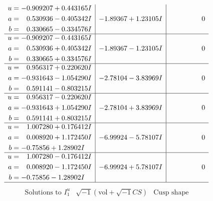 \documentclass[1p]{elsarticle_modified}
\theoremstyle{definition}
\newcommand{\I}{\sqrt{-1}}
\begin{document}
$$\begin{array}{c|c|c}
\begin{aligned}
u &= -0.909207 + 0.443165 I \\
a &= \phantom{-}0.530936 - 0.405342 I \\
b &= \phantom{-}0.330665 - 0.334576 I\end{aligned}
 & -1.89367 + 1.23105 I & \phantom{-0.000000 } 0 \\ \hline\begin{aligned}
u &= -0.909207 - 0.443165 I \\
a &= \phantom{-}0.530936 + 0.405342 I \\
b &= \phantom{-}0.330665 + 0.334576 I\end{aligned}
 & -1.89367 - 1.23105 I & \phantom{-0.000000 } 0 \\ \hline\begin{aligned}
u &= \phantom{-}0.956317 + 0.220620 I \\
a &= -0.931643 - 1.054290 I \\
b &= \phantom{-}0.591141 - 0.803215 I\end{aligned}
 & -2.78104 - 3.83969 I & \phantom{-0.000000 } 0 \\ \hline\begin{aligned}
u &= \phantom{-}0.956317 - 0.220620 I \\
a &= -0.931643 + 1.054290 I \\
b &= \phantom{-}0.591141 + 0.803215 I\end{aligned}
 & -2.78104 + 3.83969 I & \phantom{-0.000000 } 0 \\ \hline\begin{aligned}
u &= \phantom{-}1.007280 + 0.176412 I \\
a &= \phantom{-}0.008920 + 1.172450 I \\
b &= -0.75856 + 1.28902 I\end{aligned}
 & -6.99924 - 5.78107 I & \phantom{-0.000000 } 0 \\ \hline\begin{aligned}
u &= \phantom{-}1.007280 - 0.176412 I \\
a &= \phantom{-}0.008920 - 1.172450 I \\
b &= -0.75856 - 1.28902 I\end{aligned}
 & -6.99924 + 5.78107 I & \phantom{-0.000000 } 0\\
 \hline 
 \end{array}$$\newpage$$\begin{array}{c|c|c}  
\text{Solutions to }I^u_{1}& \I (\text{vol} + \sqrt{-1}CS) & \text{Cusp shape}\\
 \hline 
\begin{aligned}

\end{aligned}
\end{array}$$
\end{document}
